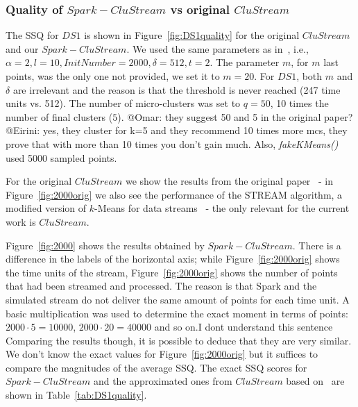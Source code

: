 
\subsubsection{Quality of $Spark-CluStream$ vs original $CluStream$}
\label{sec:expQuality-vs-CluStream}

The SSQ for $DS1$ is shown in Figure~\ref{fig:DS1quality} for the original $CluStream$ and our $Spark-CluStream$.
We used the same parameters as in~\cite{clustreamOrig}, i.e., $\alpha=2,l=10,InitNumber=2000,\delta=512,t=2$.
The parameter $m$, for $m$ last points, was the only one not provided, we set it to $m=20$.
For $DS1$, both $m$ and $\delta$ are irrelevant and the reason is that the threshold is never reached (247 time units vs. 512). 
The number of micro-clusters was set to $q=50$, 10 times the number of final clusters ($5$). \color{red}@Omar: they suggest 50 and 5 in the original paper?\color{black}\color{blue}@Eirini: yes, they cluster for k=5  and they recommend 10 times more mcs, they prove that with more than 10 times you don't gain much\color{black}. 
Also, \textit{fakeKMeans()} used 5000 sampled points.

For the original $CluStream$ we show the results from the original paper~\cite{clustreamOrig} - in Figure~\ref{fig:2000orig} we also see the performance of the STREAM algorithm, a modified version of $k$-Means for data 
streams~\cite{STREAM} - the only relevant for the current work is $CluStream$.

Figure~\ref{fig:2000} shows the results obtained by $Spark-CluStream$. There is a difference in the labels of the horizontal axis; while Figure~\ref{fig:2000orig} shows the time units of the stream, Figure~\ref{fig:2000orig} shows the number of points that had been streamed and processed. The reason is that Spark and the simulated stream  do not deliver the same amount of points for each time unit. %
A basic multiplication was used to determine the exact moment in terms of points: $2000\cdot 5 = 10000$, $2000\cdot 20 = 40000$ and so on.\color{red}I dont understand this sentence \color{black}
Comparing the results though, it is possible to deduce that they are very similar. We don't know the exact values for Figure~\ref{fig:2000orig} but it suffices to compare the magnitudes of the average SSQ. 
The exact SSQ scores for $Spark-CluStream$ and the approximated ones from $CluStream$ based on~\cite{CluStream} are shown in Table~\ref{tab:DS1quality}.

